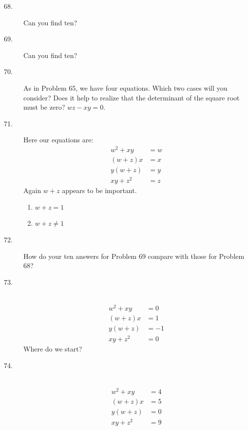 \documentclass{article}
\begin{document}
\begin{description}
  \item[68.] Can you find ten? 

  \item[69.] Can you find ten? 

  \item[70.] As in Problem 65, we have four equations. Which two cases will you consider? Does it help to realize that the determinant of the square root must be zero? $wz -xy = 0$. 

  \item[71.] Here our equations are:
    \begin{align*}
    w^2 + xy & = w \\
     (w+z) x & = x \\ 
     y (w+z) & = y \\
    xy + z^2 & = z
    \end{align*}
    Again $w+z$ appears to be important.
    \begin{enumerate}[\hspace{1cm}(I)]
      \item $w+z = 1$
      \item $w+z \neq 1$
    \end{enumerate}

  \item[72.] How do your ten answers for Problem 69 compare with those for Problem 68?

  \item[73.] $\ $
    \begin{align*} 
    w^2 + xy & = 0 \\
     (w+z) x & = 1 \\ 
     y (w+z) & = -1 \\
    xy + z^2 & = 0
    \end{align*}
    Where do we start? 

  \item[74.] $\ $
    \begin{align*} 
    w^2 + xy & = 4 \\
     (w+z) x & = 5 \\ 
     y (w+z) & = 0 \\
    xy + z^2 & = 9
    \end{align*}


\end{description}
\end{document}
